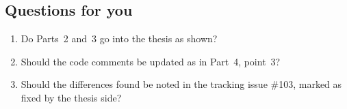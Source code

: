\documentclass[11pt,a4paper]{article}
\begin{document}
\subsection*{Questions for you}
\begin{enumerate}[leftmargin=1.5em]
\item Do Parts~2 and~3 go into the thesis as shown?
\item Should the code comments be updated as in Part~4, point~3?
\item Should the differences found be noted in the tracking issue \#103,
marked as fixed by the thesis side?
\end{enumerate}
\end{document}
